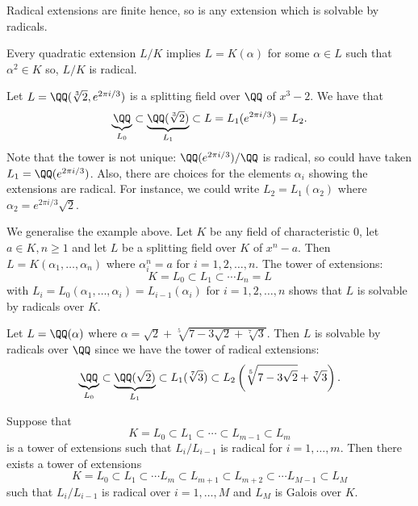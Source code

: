 \documentclass[12pt, a4paper]{article}
\begin{document}
\begin{mdnote}
    Radical extensions are finite hence, so is any extension which is solvable by radicals.
\end{mdnote}

\begin{example}
    Every quadratic extension \(L/K\) implies \(L=K(\alpha)\) for some \(\alpha\in L\) such that \(\alpha^2\in K\) so, \(L/K\)  is radical.
\end{example}

\begin{mdexample}
    Let \(L = \QQ(\sqrt[3]{2},e^{2\pi i/3})\) is a splitting field over \(\QQ\) of \(x^3-2\). We have that 
    \[\underbrace{\QQ}_{L_0} \subset \underbrace{\QQ(\sqrt[3]{2})}_{L_1} \subset L = L_1(e^{2\pi i/3})=L_2.\]
    Note that the tower is not unique: \(\QQ(e^{2\pi i/3})/\QQ\) is radical, so could have taken \(L_1=\QQ(e^{2\pi i/3})\). Also, there are choices for the elements \(\alpha_i\) showing the extensions are radical. For instance, we could write \(L_2=L_1(\alpha_2)\) where \(\alpha_2 = e^{2\pi i/3}\sqrt{2}\).
\end{mdexample}

\begin{mdexample}
    We generalise the example above. Let \(K\) be any field of characteristic \(0\), let \(a\in K , n\geq 1\) and let \(L\) be a splitting field over \(K\) of \(x^n-a\). Then \(L = K(\alpha_1,\ldots,\alpha_n)\) where \(\alpha_i^n =a\) for \(i=1,2,\ldots,n\). The tower of extensions:
    \[K = L_0 \subset L_1 \subset \cdots L_n = L\]
    with \(L_i=L_0(\alpha_1,\ldots,\alpha_i) = L_{i-1}(\alpha_i)\) for \(i=1,2,\ldots,n\) shows that \(L\) is solvable by radicals over \(K\).
\end{mdexample}

\begin{example}
    Let \(L = \QQ(\alpha)\) where \(\alpha = \sqrt{2}+\sqrt[5]{7-3\sqrt{2}+\sqrt[7]{3}}\). Then \(L\) is solvable by radicals over \(\QQ\) since we have the tower of radical extensions:
    \[\underbrace{\QQ}_{L_0} \subset \underbrace{\QQ(\sqrt{2})}_{L_1}\subset L_1(\sqrt[7]{3}) \subset L_2\left(\sqrt[5]{7-3\sqrt{2}}+\sqrt[7]{3}\right).\]
\end{example}

\begin{mdprop}
    Suppose that 
    \[K= L_0 \subset L_1 \subset \cdots \subset L_{m-1}\subset L_m\]
    is a tower of extensions such that \(L_i/L_{i-1}\) is radical for \(i = 1,\ldots,m\). Then there exists a tower of extensions 
    \[K= L_0 \subset L_1\subset \cdots L_m \subset L_{m+1}\subset L_{m+2} \subset \cdots L_{M-1}\subset L_M\]
    such that \(L_i/L_{i-1}\) is radical over \(i=1,\ldots,M\) and \(L_M\) is Galois over \(K\). 
\end{mdprop}
\end{document}
